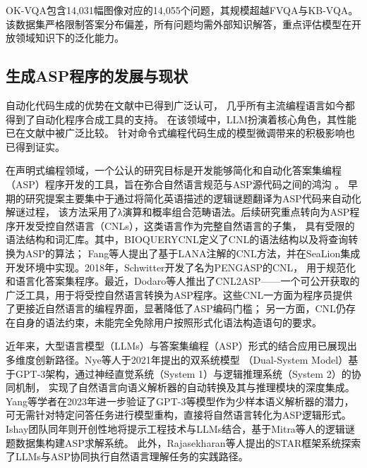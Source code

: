 OK-VQA\cite{marino2019ok}包含14,031幅图像对应的14,055个问题，其规模超越FVQA与KB-VQA。该数据集严格限制答案分布偏差，所有问题均需外部知识解答，重点评估模型在开放领域知识下的泛化能力。

\subsection{生成ASP程序的发展与现状}
自动化代码生成的优势在文献中已得到广泛认可\cite{ernst2022ai}\cite{peng2023impact}\cite{dakhel2023github}，
几乎所有主流编程语言如今都得到了自动化程序合成工具的支持\cite{chen2021evaluating}。
在该领域中，LLM扮演着核心角色，其性能已在文献中被广泛比较\cite{xu2022systematic}\cite{wang2023codet5+}。
针对命令式编程代码生成的模型微调带来的积极影响也已得到证实\cite{ma2024llamoco}。

在声明式编程领域，一个公认的研究目标是开发能够简化和自动化答案集编程（ASP）程序开发的工具，旨在弥合自然语言规范与ASP源代码之间的鸿沟
\cite{erdem2009transforming}\cite{fang2017approach}\cite{schwitter2018specifying}\cite{caruso2024cnl2asp}。
早期的研究提案主要集中于通过将简化英语描述的逻辑谜题翻译为ASP代码来自动化解谜过程\cite{baral2012solving}，
该方法采用了λ演算和概率组合范畴语法。后续研究重点转向为ASP程序开发受控自然语言（CNLs）\cite{kuhn2014survey}，这类语言作为完整自然语言的子集，
具有受限的语法结构和词汇库。其中，BIOQUERYCNL\cite{erdem2009transforming}定义了CNL的语法结构以及将查询转换为ASP的算法；
Fang等人提出了基于LANA注解的CNL方法，并在SeaLion集成开发环境中实现\cite{fang2017approach}。2018年，Schwitter开发了名为PENGASP的CNL，
用于规范化和语言化答案集程序\cite{schwitter2018specifying}。最近，Dodaro等人推出了CNL2ASP——一个可公开获取的广泛工具，用于将受控自然语言转换为ASP程序\cite{caruso2024cnl2asp}。这些CNL一方面为程序员提供了更接近自然语言的编程界面，显著降低了ASP编码门槛；
另一方面，CNL仍存在自身的语法约束，未能完全免除用户按照形式化语法构造语句的要求。

近年来，大型语言模型（LLMs）与答案集编程（ASP）形式的结合应用已展现出多维度创新路径。Nye等人于2021年提出的双系统模型
（Dual-System Model）基于GPT-3架构，通过神经直觉系统（System 1）与逻辑推理系统（System 2）的协同机制，
实现了自然语言向语义解析器的自动转换及其与推理模块的深度集成\cite{nye2021improving}。Yang等学者在2023年进一步验证了GPT-3等模型作为少样本语义解析器的潜力，
可无需针对特定问答任务进行模型重构，直接将自然语言转化为ASP逻辑形式\cite{yang2023coupling}。
Ishay团队同年则开创性地将提示工程技术与LLMs结合，基于Mitra等人的逻辑谜题数据集构建ASP求解系统\cite{mitra2016addressing}。
此外，Rajasekharan等人提出的STAR框架系统探索了LLMs与ASP协同执行自然语言理解任务的实践路径\cite{rajasekharan2023reliable}。

